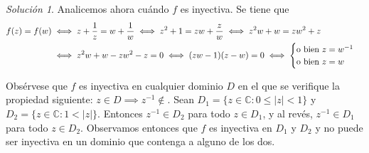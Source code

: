 \documentclass[11pt]{report}
\newcommand{\C}{\mathbb C}
\theoremstyle{remark}
\newtheorem*{resolution}{Solución}
\begin{document}
\begin{resolution}
Analicemos ahora cuándo $f$ es inyectiva. Se tiene que
\[
\begin{aligned}[t]
f(z)= f(w) &\iff z+\frac{1}{z}=w+\frac{1}{w} \iff z^2+1=zw+\frac{z}{w} \iff z^2w+w=zw^2+z \\
&\iff z^2w+w-zw^2-z=0 \iff (zw-1)(z-w)=0 \iff \begin{cases}
    $o bien $ z=w^{-1} \\
    $o bien $ z = w
\end{cases}
\end{aligned}
\]
\end{resolution}

Obsérvese que $f$ es inyectiva en cualquier dominio $D$ en el que se verifique la propiedad siguiente: $z \in D \implies z^{-1} \not\in$. Sean $D_1=\{z \in \C \colon 0\leq |z| <1\}$ y $D_2 = \{z \in \C \colon 1<|z|\}$. Entonces $z^{-1} \in D_2$ para todo $z \in D_1$, y al revés, $z^{-1} \in D_1$ para todo $z \in D_2$. Observamos entonces que $f$ es inyectiva en $D_1$ y $D_2$ y no puede ser inyectiva en un dominio que contenga a alguno de los dos.
\end{document}
